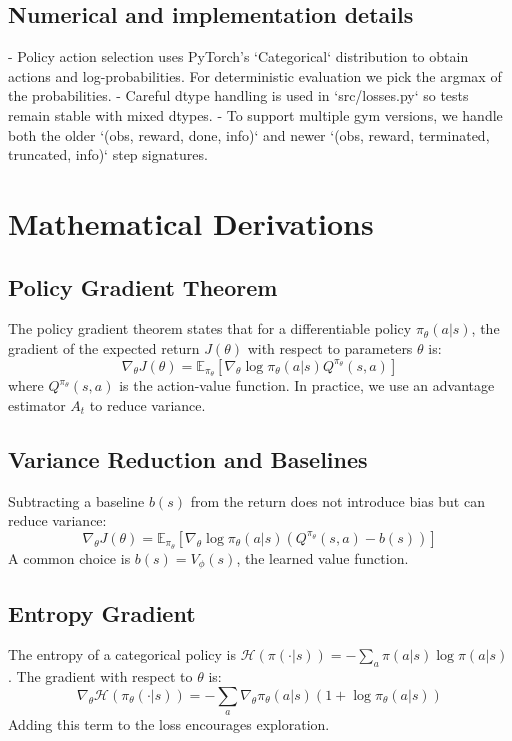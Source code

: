 \documentclass[11pt]{article}
\begin{document}
\subsection{Numerical and implementation details}
- Policy action selection uses PyTorch's `Categorical` distribution to obtain
  actions and log-probabilities. For deterministic evaluation we pick the
  argmax of the probabilities.
- Careful dtype handling is used in `src/losses.py` so tests remain stable with
  mixed dtypes.
- To support multiple gym versions, we handle both the older `(obs, reward,
  done, info)` and newer `(obs, reward, terminated, truncated, info)` step
  signatures.

\section{Mathematical Derivations}
\subsection{Policy Gradient Theorem}
The policy gradient theorem states that for a differentiable policy $\pi_\theta(a|s)$, the gradient of the expected return $J(\theta)$ with respect to parameters $\theta$ is:
$$
\nabla_\theta J(\theta) = \mathbb{E}_{\pi_\theta}\left[ \nabla_\theta \log \pi_\theta(a|s) Q^{\pi_\theta}(s,a) \right]
$$
where $Q^{\pi_\theta}(s,a)$ is the action-value function. In practice, we use an advantage estimator $A_t$ to reduce variance.

\subsection{Variance Reduction and Baselines}
Subtracting a baseline $b(s)$ from the return does not introduce bias but can reduce variance:
$$
\nabla_\theta J(\theta) = \mathbb{E}_{\pi_\theta}\left[ \nabla_\theta \log \pi_\theta(a|s) (Q^{\pi_\theta}(s,a) - b(s)) \right]
$$
A common choice is $b(s) = V_\phi(s)$, the learned value function.

\subsection{Entropy Gradient}
The entropy of a categorical policy is $\mathcal{H}(\pi(\cdot|s)) = -\sum_a \pi(a|s) \log \pi(a|s)$. The gradient with respect to $\theta$ is:
$$
\nabla_\theta \mathcal{H}(\pi_\theta(\cdot|s)) = -\sum_a \nabla_\theta \pi_\theta(a|s) (1 + \log \pi_\theta(a|s))
$$
Adding this term to the loss encourages exploration.
\end{document}
